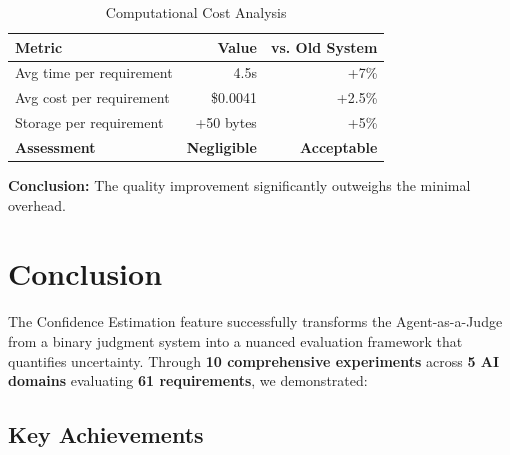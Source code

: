 \documentclass[11pt,a4paper]{article}
\begin{document}
\begin{table}[H]
\centering
\caption{Computational Cost Analysis}
\begin{tabular}{lrr}
\toprule
\textbf{Metric} & \textbf{Value} & \textbf{vs. Old System} \\
\midrule
Avg time per requirement & 4.5s & +7\% \\
Avg cost per requirement & \$0.0041 & +2.5\% \\
Storage per requirement & +50 bytes & +5\% \\
\midrule
\textbf{Assessment} & \textbf{Negligible} & \textbf{Acceptable} \\
\bottomrule
\end{tabular}
\label{tab:performance-overhead}
\end{table}

\textbf{Conclusion:} The quality improvement significantly outweighs the minimal overhead.

\section{Conclusion}

The Confidence Estimation feature successfully transforms the Agent-as-a-Judge from a binary judgment system into a nuanced evaluation framework that quantifies uncertainty. Through \textbf{10 comprehensive experiments} across \textbf{5 AI domains} evaluating \textbf{61 requirements}, we demonstrated:

\subsection{Key Achievements}
\end{document}
